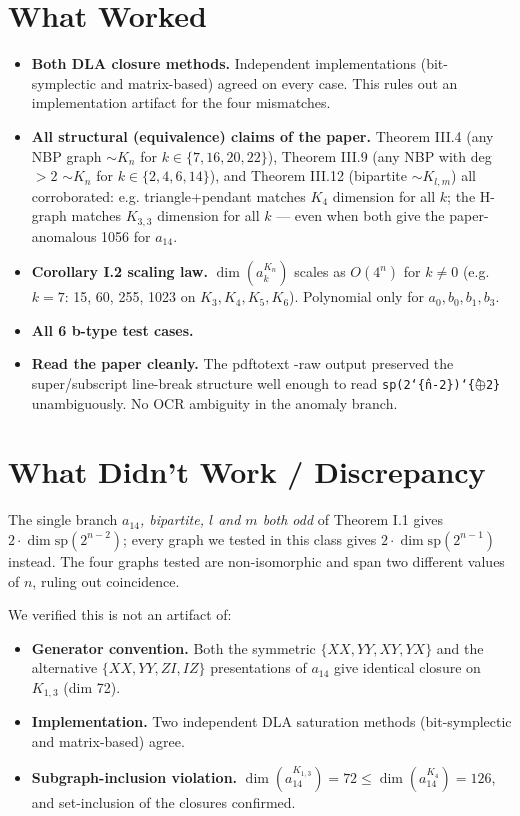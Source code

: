 \documentclass[11pt]{article}
\begin{document}
\section{What Worked}

\begin{itemize}\itemsep0pt
  \item \textbf{Both DLA closure methods.} Independent implementations (bit-symplectic and matrix-based) agreed on every case. This rules out an implementation artifact for the four mismatches.
  \item \textbf{All structural (equivalence) claims of the paper.} Theorem III.4 (any NBP graph $\sim K_n$ for $k\in\{7,16,20,22\}$), Theorem III.9 (any NBP with deg${>}2$ $\sim K_n$ for $k\in\{2,4,6,14\}$), and Theorem III.12 (bipartite $\sim K_{l,m}$) all corroborated: e.g. triangle+pendant matches $K_4$ dimension for all $k$; the H-graph matches $K_{3,3}$ dimension for all $k$ --- even when both give the paper-anomalous 1056 for $a_{14}$.
  \item \textbf{Corollary I.2 scaling law.} $\dim(a_k^{K_n})$ scales as $O(4^n)$ for $k\ne 0$ (e.g.\ $k{=}7$: 15, 60, 255, 1023 on $K_3, K_4, K_5, K_6$). Polynomial only for $a_0, b_0, b_1, b_3$.
  \item \textbf{All 6 b-type test cases.}
  \item \textbf{Read the paper cleanly.} The pdftotext -raw output preserved the super/subscript line-break structure well enough to read \texttt{sp(2\char`\^\{n-2\})\char`\^\{$\oplus$2\}} unambiguously. No OCR ambiguity in the anomaly branch.
\end{itemize}

\section{What Didn't Work / Discrepancy}

The single branch \emph{$a_{14}$, bipartite, $l$ and $m$ both odd} of Theorem I.1 gives $2\cdot\dim\mathrm{sp}(2^{n-2})$; every graph we tested in this class gives $2\cdot\dim\mathrm{sp}(2^{n-1})$ instead. The four graphs tested are non-isomorphic and span two different values of $n$, ruling out coincidence.

We verified this is not an artifact of:
\begin{itemize}\itemsep0pt
  \item \textbf{Generator convention.} Both the symmetric $\{XX, YY, XY, YX\}$ and the alternative $\{XX, YY, ZI, IZ\}$ presentations of $a_{14}$ give identical closure on $K_{1,3}$ (dim 72).
  \item \textbf{Implementation.} Two independent DLA saturation methods (bit-symplectic and matrix-based) agree.
  \item \textbf{Subgraph-inclusion violation.} $\dim(a_{14}^{K_{1,3}})=72\le \dim(a_{14}^{K_4})=126$, and set-inclusion of the closures confirmed.
\end{itemize}
\end{document}

